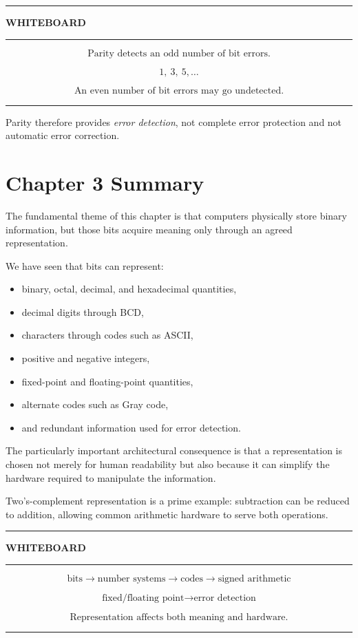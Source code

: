 \documentclass[11pt]{article}
\newenvironment{whiteboard}
{
    \par\medskip
    \begin{center}
    \begin{minipage}{0.94\textwidth}
    \hrule
    \vspace{0.4em}
    \textbf{\large WHITEBOARD}
    \vspace{0.3em}
    \hrule
    \vspace{0.7em}
}
{
    \vspace{0.5em}
    \hrule
    \end{minipage}
    \end{center}
    \medskip
}
\begin{document}
\begin{whiteboard}
\[
\boxed{\text{Parity detects an odd number of bit errors.}}
\]

\[
1,\ 3,\ 5,\ldots
\]

\[
\boxed{\text{An even number of bit errors may go undetected.}}
\]
\end{whiteboard}

Parity therefore provides \emph{error detection}, not complete error protection
and not automatic error correction.

\section{Chapter 3 Summary}

The fundamental theme of this chapter is that computers physically store
binary information, but those bits acquire meaning only through an agreed
representation.

We have seen that bits can represent:

\begin{itemize}
    \item binary, octal, decimal, and hexadecimal quantities,
    \item decimal digits through BCD,
    \item characters through codes such as ASCII,
    \item positive and negative integers,
    \item fixed-point and floating-point quantities,
    \item alternate codes such as Gray code,
    \item and redundant information used for error detection.
\end{itemize}

The particularly important architectural consequence is that a representation
is chosen not merely for human readability but also because it can simplify
the hardware required to manipulate the information.

Two's-complement representation is a prime example: subtraction can be
reduced to addition, allowing common arithmetic hardware to serve both
operations.

\begin{whiteboard}
\[
\boxed{
\text{bits}
\rightarrow
\text{number systems}
\rightarrow
\text{codes}
\rightarrow
\text{signed arithmetic}
}
\]

\[
\boxed{
\text{fixed/floating point}
\rightarrow
\text{error detection}
}
\]

\[
\boxed{\text{Representation affects both meaning and hardware.}}
\]
\end{whiteboard}
\end{document}

